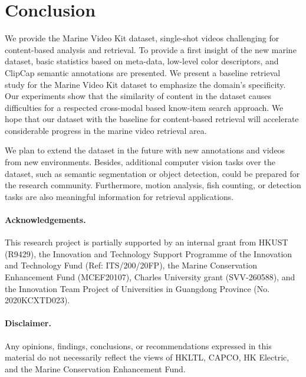 \documentclass[runningheads]{llncs}
\begin{document}
\section{Conclusion}
\label{sec:conclusion}
We provide the Marine Video Kit dataset, single-shot videos challenging for content-based analysis and retrieval. To provide a first insight of the new marine dataset, basic statistics based on meta-data, low-level color descriptors, and ClipCap semantic annotations are presented. We present a baseline retrieval study for the Marine Video Kit dataset to emphasize the domain's specificity. Our experiments show that the similarity of content in the dataset causes difficulties for a respected cross-modal based know-item search approach. We hope that our dataset with the baseline for content-based retrieval will accelerate considerable progress in the marine video retrieval area.  

We plan to extend the dataset in the future with new annotations and videos from new environments. Besides, additional computer vision tasks over the dataset, such as semantic segmentation or object detection, could be prepared for the research community. Furthermore, motion analysis, fish counting, or detection tasks are also meaningful information for retrieval applications.

\paragraph{\textbf{Acknowledgements.}} 
This research project is partially supported by an internal grant from HKUST (R9429), the Innovation and Technology Support Programme of the Innovation and Technology Fund (Ref: ITS/200/20FP), the Marine Conservation Enhancement Fund (MCEF20107), Charles University grant (SVV-260588), and the Innovation Team Project of Universities in Guangdong Province (No. 2020KCXTD023).

\paragraph{\textbf{Disclaimer.}} 
Any opinions, findings, conclusions, or recommendations expressed in this material do not necessarily reflect the views of HKLTL, CAPCO, HK Electric, and the Marine Conservation Enhancement Fund.



\end{document}
